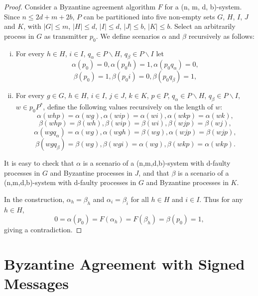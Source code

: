 \documentclass[11pt,conference,compsoc,onecolumn,romanappendices]{IEEEtran}
\newcommand{\nocomma}{}
\newenvironment{enumerateroman}{\begin{enumerate}[i.] }{\end{enumerate}}
\begin{document}
\begin{proof}
  Consider a Byzantine agreement algorithm $F$ for a
  (n, m, d, b)-system. Since $n \leqslant 2 d + m + 2 b$, $P$ can be
  partitioned into five non-empty sets $G$, $H$, $I$, $J$ and $K$, with $| G |
  \leqslant m$, $| H | \leqslant d$, $| I | \leqslant d$, $| J | \leqslant b$,
  $| K | \leqslant b$. Select an arbitrarily process in $G$ as transmitter
  $p_0$. We define scenarios $\alpha$ and $\beta$ recursively as follows:
  \begin{enumerateroman}
    \item For every $h \in H$, $i \in I$, $q_{\alpha} \in P \backslash H$, $q_{\beta}
    \in P \backslash I$ let
    \[ \alpha (p_0) = 0, \alpha (p_0 h) = 1, \alpha (p_0 q_{\alpha}) = 0, \]
    \[ \beta (p_0) = 1, \beta (p_0 i) = 0, \beta (p_0 q_{\beta}) = 1, \]
    \item For every $g \in G$, $h \in H$, $i \in I$, $j \in J$, $k \in K$, $p
    \in P$, $q_{\alpha} \in P \backslash H$, $q_{\beta} \in P \backslash I$, $w \in p_0 P^{\ast}$, define the following values recursively on the
    length of $w$:
    \[ \alpha (w h p) = \alpha (w g) \nocomma, \alpha (w i p) = \alpha (w i),
       \alpha (w k p) = \alpha (w k), \]
    \[ \beta (w h p) = \beta (w h) \nocomma, \beta (w i p) = \beta (w i),
       \beta (w j p) = \beta (w j), \]
    \[ \alpha (w g q_{\alpha}) = \alpha (w g), \alpha (w g h) = \beta (w g),
       \alpha (w j p) = \beta (w j p), \]
    \[ \beta (w g q_{\beta}) = \beta (w g), \beta (w g i) = \alpha (w g),
       \beta (w k p) = \alpha (w k p) . \]
  \end{enumerateroman}
  It is easy to check that $\alpha$ is a scenario of a (n,m,d,b)-system with d-faulty processes in $G$ and Byzantine processes in $J$, and that $\beta$ is a scenario of a (n,m,d,b)-system with d-faulty processes in $G$ and Byzantine processes in $K$.

  In the construction, $\alpha_h =
  \beta_h$ and $\alpha_i = \beta_i$ for all $h \in H$ and $i \in I$. Thus for
  any $h \in H$,
  \[ 0 = \alpha (p_0) = F (\alpha_h) = F (\beta_h) = \beta (p_0)
     = 1, \]
  giving a contradiction.
\end{proof}

\section{Byzantine Agreement with Signed Messages\label{app-sba}}
\end{document}
